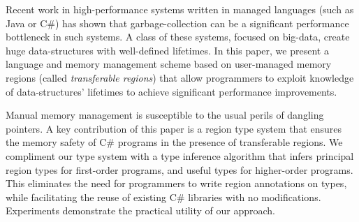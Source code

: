 Recent work in high-performance systems written in managed languages
(such as Java or C\#) has shown that garbage-collection can be a
significant performance bottleneck in such systems.  A class of these
systems, focused on big-data, create huge data-structures with
well-defined lifetimes.  In this paper, we present a language and
memory management scheme based on user-managed memory regions (called
\emph{transferable regions}) that allow programmers to exploit
knowledge of data-structures' lifetimes to achieve significant
performance improvements.

Manual memory management is susceptible to the usual perils of
dangling pointers.  A key contribution of this paper is a region type
system that ensures the memory safety of C\# programs in the presence
of transferable regions. We compliment our type system with a type
inference algorithm that infers principal region types for first-order
programs, and useful types for higher-order programs. This eliminates
the need for programmers to write region annotations on types, while
facilitating the reuse of existing C\# libraries with no
modifications. Experiments demonstrate the practical utility of our
approach.

